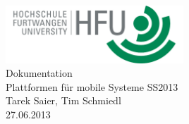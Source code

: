 \documentclass[pdftex,fontsize=11pt,a4paper]{scrbook}
\begin{document}
\begin{titlepage}
\thispagestyle{empty}
\begin{center}
\includegraphics[width=0.5\textwidth]{img/hfu.png}~\\[1.5cm]
\Huge Dokumentation\\[0.4cm]
\Huge Plattformen für mobile Systeme SS2013\\[1cm]
\LARGE Tarek Saier, Tim Schmiedl\\[0.2cm]
\normalsize 27.06.2013
\end{center}
\end{titlepage}
\end{document}
